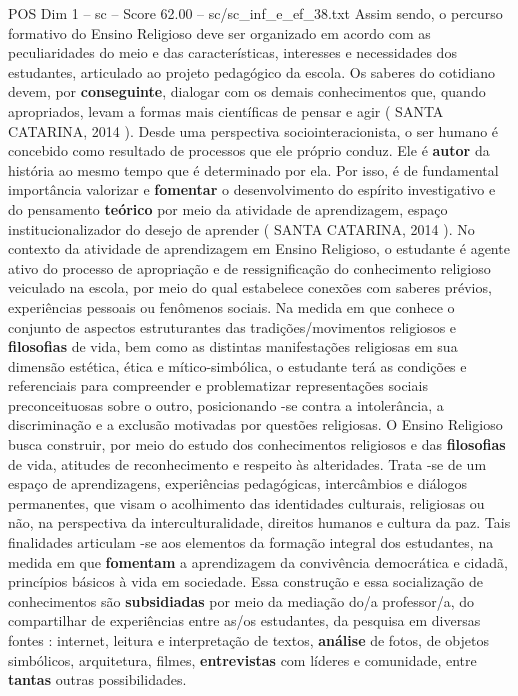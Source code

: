 \begin{textsample}{POS Dim 1 – sc – Score 62.00 – sc/sc\_inf\_e\_ef\_38.txt}
Assim sendo, o percurso formativo do Ensino Religioso deve ser organizado em acordo com as peculiaridades do meio e das características, interesses e necessidades dos estudantes, articulado ao projeto pedagógico da escola.
Os saberes do cotidiano devem, por \textbf{conseguinte}, dialogar com os demais conhecimentos que, quando apropriados, levam a formas mais científicas de pensar e agir ( SANTA CATARINA, 2014 ).
Desde uma perspectiva sociointeracionista, o ser humano é concebido como resultado de processos que ele próprio conduz.
Ele é \textbf{autor} da história ao mesmo tempo que é determinado por ela.
Por isso, é de fundamental importância valorizar e \textbf{fomentar} o desenvolvimento do espírito investigativo e do pensamento \textbf{teórico} por meio da atividade de aprendizagem, espaço institucionalizador do desejo de aprender ( SANTA CATARINA, 2014 ).
No contexto da atividade de aprendizagem em Ensino Religioso, o estudante é agente ativo do processo de apropriação e de ressignificação do conhecimento religioso veiculado na escola, por meio do qual estabelece conexões com saberes prévios, experiências pessoais ou fenômenos sociais.
Na medida em que conhece o conjunto de aspectos estruturantes das tradições/movimentos religiosos e \textbf{filosofias} de vida, bem como as distintas manifestações religiosas em sua dimensão estética, ética e mítico-simbólica, o estudante terá as condições e referenciais para compreender e problematizar representações sociais preconceituosas sobre o outro, posicionando -se contra a intolerância, a discriminação e a exclusão motivadas por questões religiosas.
O Ensino Religioso busca construir, por meio do estudo dos conhecimentos religiosos e das \textbf{filosofias} de vida, atitudes de reconhecimento e respeito às alteridades.
Trata -se de um espaço de aprendizagens, experiências pedagógicas, intercâmbios e diálogos permanentes, que visam o acolhimento das identidades culturais, religiosas ou não, na perspectiva da interculturalidade, direitos humanos e cultura da paz.
Tais finalidades articulam -se aos elementos da formação integral dos estudantes, na medida em que \textbf{fomentam} a aprendizagem da convivência democrática e cidadã, princípios básicos à vida em sociedade.
Essa construção e essa socialização de conhecimentos são \textbf{subsidiadas} por meio da mediação do/a professor/a, do compartilhar de experiências entre as/os estudantes, da pesquisa em diversas fontes : internet, leitura e interpretação de textos, \textbf{análise} de fotos, de objetos simbólicos, arquitetura, filmes, \textbf{entrevistas} com líderes e comunidade, entre \textbf{tantas} outras possibilidades.

\end{textsample}
